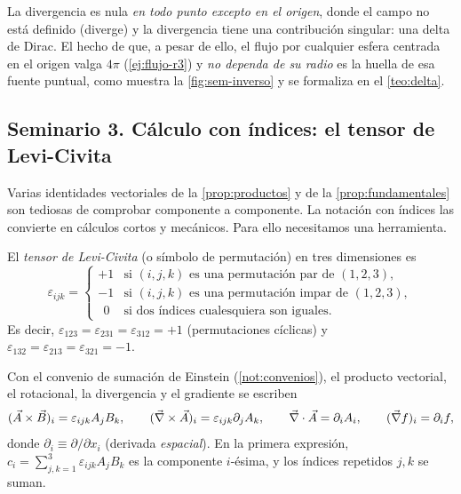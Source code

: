 \begin{observacion}
La divergencia es nula \emph{en todo punto excepto en el origen}, donde el
campo no está definido (diverge) y la divergencia tiene una contribución
singular: una delta de Dirac. El hecho de que, a pesar de ello, el flujo por
cualquier esfera centrada en el origen valga $4\pi$ (\cref{ej:flujo-r3}) y
\emph{no dependa de su radio} es la huella de esa fuente puntual, como muestra
la \cref{fig:sem-inverso} y se formaliza en el \cref{teo:delta}.
\end{observacion}



\subsection{Seminario 3. Cálculo con índices: el tensor de Levi-Civita}\label{sem:levi}\label{sec:levi-civita}
Varias identidades vectoriales de la \cref{prop:productos} y de la
\cref{prop:fundamentales} son tediosas de comprobar componente a componente.
La notación con índices las convierte en cálculos cortos y mecánicos. Para ello
necesitamos una herramienta.

\begin{definicion}\label{def:levi-civita}
El \emph{tensor de Levi-Civita} (o símbolo de permutación) en tres dimensiones es
\[
  \varepsilon_{ijk}=\begin{cases}
    +1 & \text{si }(i,j,k)\text{ es una permutación par de }(1,2,3),\\
    -1 & \text{si }(i,j,k)\text{ es una permutación impar de }(1,2,3),\\
    \ \ 0 & \text{si dos índices cualesquiera son iguales.}
  \end{cases}
\]
Es decir, $\varepsilon_{123}=\varepsilon_{231}=\varepsilon_{312}=+1$ (permutaciones
cíclicas) y $\varepsilon_{132}=\varepsilon_{213}=\varepsilon_{321}=-1$.
\end{definicion}



Con el convenio de sumación de Einstein (\cref{not:convenios}), el producto
vectorial, el rotacional, la divergencia y el gradiente se escriben
\begin{equation}\label{eq:indices}
  (\vec{A}\times\vec{B})_i=\varepsilon_{ijk}A_jB_k,\qquad
  (\vec{\nabla}\times\vec{A})_i=\varepsilon_{ijk}\partial_jA_k,\qquad
  \vec{\nabla}\cdot\vec{A}=\partial_iA_i,\qquad
  (\vec{\nabla} f)_i=\partial_if ,
\end{equation}
donde $\partial_i\equiv\partial/\partial x_i$ (derivada \emph{espacial}). En la
primera expresión, $c_i=\sum_{j,k=1}^{3}\varepsilon_{ijk}A_jB_k$ es la componente
$i$-ésima, y los índices repetidos $j,k$ se suman.

